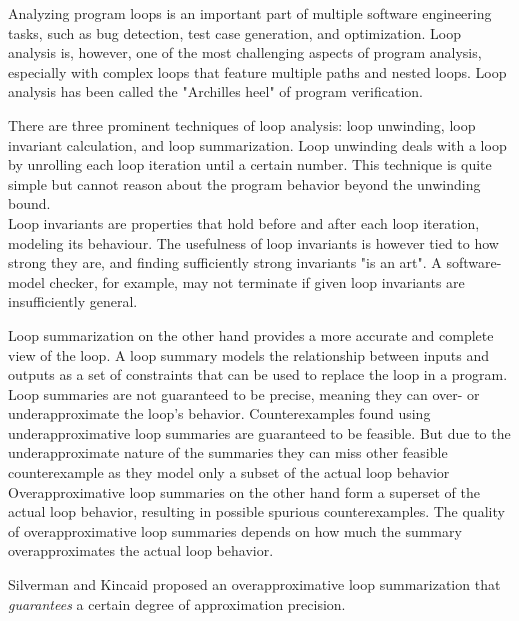 
Analyzing program loops is an important part of multiple software engineering tasks, such as bug detection, test case generation, and optimization. Loop analysis is, however, one of the most challenging aspects of program analysis, especially with complex loops that feature multiple paths and nested loops. Loop analysis has been called the "Archilles heel" of program verification\cite{DBLP:journals/fmsd/KroeningSTTW13}. \par
There are three prominent techniques of loop analysis: loop unwinding, loop invariant calculation, and loop summarization\cite{DBLP:journals/fmsd/KroeningSTTW13 , DBLP:conf/cav/SilvermanK19, DBLP:journals/tse/XieCZLLL19}. Loop unwinding deals with a loop by unrolling each loop iteration until a certain number. This technique is quite simple but cannot reason about the program behavior beyond the unwinding bound. \\
Loop invariants are properties that hold before and after each loop iteration, modeling its behaviour. The usefulness of loop invariants is however tied to how strong they are, and finding sufficiently strong invariants "is an art"\cite{DBLP:journals/fmsd/KroeningSTTW13}. A software-model checker, for example, may not terminate if given loop invariants are insufficiently general. \par
Loop summarization on the other hand provides a more accurate and complete view of the loop. A loop summary models the relationship between inputs and outputs as a set of constraints that can be used to replace the loop in a program. Loop summaries are not guaranteed to be precise, meaning they can over- or underapproximate the loop's behavior. Counterexamples found using underapproximative loop summaries are guaranteed to be feasible. But due to the underapproximate nature of the summaries they can miss other feasible counterexample as they model only a subset of the actual loop behavior \cite{DBLP:journals/fmsd/KroeningLW15} Overapproximative loop summaries on the other hand form a superset of the actual loop behavior, resulting in possible spurious counterexamples. The quality of overapproximative loop summaries depends on how much the summary overapproximates the actual loop behavior.\\ \par
Silverman and Kincaid\cite{DBLP:conf/cav/SilvermanK19} proposed an overapproximative loop summarization that \textsl{guarantees} a certain degree of approximation precision.\par 


